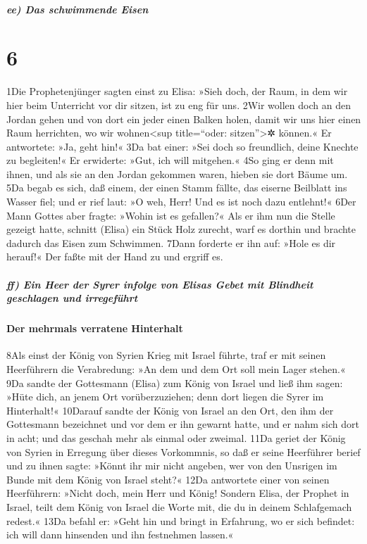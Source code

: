 \hypertarget{ee-das-schwimmende-eisen}{%
\subparagraph{ee) Das schwimmende
Eisen}\label{ee-das-schwimmende-eisen}}

\hypertarget{section-5}{%
\section{6}\label{section-5}}

1Die Prophetenjünger sagten einst zu Elisa: »Sieh doch, der Raum, in dem
wir hier beim Unterricht vor dir sitzen, ist zu eng für uns. 2Wir wollen
doch an den Jordan gehen und von dort ein jeder einen Balken holen,
damit wir uns hier einen Raum herrichten, wo wir wohnen\textless sup
title=``oder: sitzen''\textgreater✲ können.« Er antwortete: »Ja, geht
hin!« 3Da bat einer: »Sei doch so freundlich, deine Knechte zu
begleiten!« Er erwiderte: »Gut, ich will mitgehen.« 4So ging er denn mit
ihnen, und als sie an den Jordan gekommen waren, hieben sie dort Bäume
um. 5Da begab es sich, daß einem, der einen Stamm fällte, das eiserne
Beilblatt ins Wasser fiel; und er rief laut: »O weh, Herr! Und es ist
noch dazu entlehnt!« 6Der Mann Gottes aber fragte: »Wohin ist es
gefallen?« Als er ihm nun die Stelle gezeigt hatte, schnitt (Elisa) ein
Stück Holz zurecht, warf es dorthin und brachte dadurch das Eisen zum
Schwimmen. 7Dann forderte er ihn auf: »Hole es dir herauf!« Der faßte
mit der Hand zu und ergriff es.

\hypertarget{ff-ein-heer-der-syrer-infolge-von-elisas-gebet-mit-blindheit-geschlagen-und-irregefuxfchrt}{%
\subparagraph{ff) Ein Heer der Syrer infolge von Elisas Gebet mit
Blindheit geschlagen und
irregeführt}\label{ff-ein-heer-der-syrer-infolge-von-elisas-gebet-mit-blindheit-geschlagen-und-irregefuxfchrt}}

\hypertarget{der-mehrmals-verratene-hinterhalt}{%
\paragraph{Der mehrmals verratene
Hinterhalt}\label{der-mehrmals-verratene-hinterhalt}}

8Als einst der König von Syrien Krieg mit Israel führte, traf er mit
seinen Heerführern die Verabredung: »An dem und dem Ort soll mein Lager
stehen.« 9Da sandte der Gottesmann (Elisa) zum König von Israel und ließ
ihm sagen: »Hüte dich, an jenem Ort vorüberzuziehen; denn dort liegen
die Syrer im Hinterhalt!« 10Darauf sandte der König von Israel an den
Ort, den ihm der Gottesmann bezeichnet und vor dem er ihn gewarnt hatte,
und er nahm sich dort in acht; und das geschah mehr als einmal oder
zweimal. 11Da geriet der König von Syrien in Erregung über dieses
Vorkommnis, so daß er seine Heerführer berief und zu ihnen sagte: »Könnt
ihr mir nicht angeben, wer von den Unsrigen im Bunde mit dem König von
Israel steht?« 12Da antwortete einer von seinen Heerführern: »Nicht
doch, mein Herr und König! Sondern Elisa, der Prophet in Israel, teilt
dem König von Israel die Worte mit, die du in deinem Schlafgemach
redest.« 13Da befahl er: »Geht hin und bringt in Erfahrung, wo er sich
befindet: ich will dann hinsenden und ihn festnehmen lassen.«

